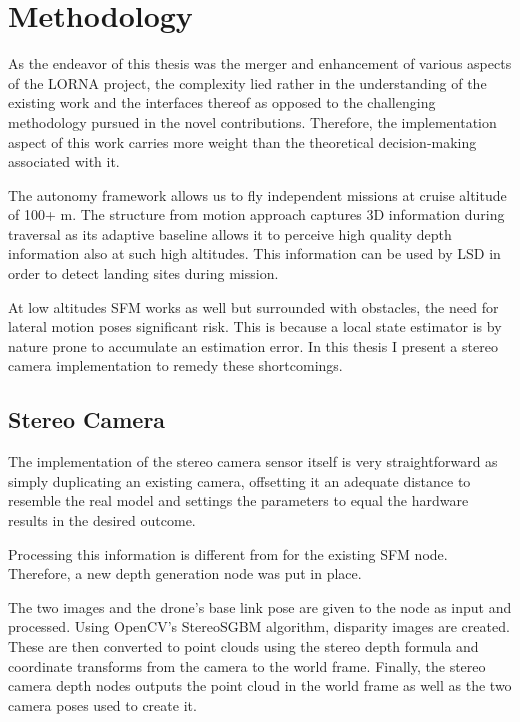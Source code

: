 \chapter{Methodology}
\label{sec:methodology}

As the endeavor of this thesis was the merger and enhancement of various aspects of the LORNA project, the complexity lied rather in the understanding of the existing work and the interfaces thereof as opposed to the challenging methodology pursued in the novel contributions. Therefore, the implementation aspect of this work carries more weight than the theoretical decision-making associated with it.

The autonomy framework\citep{Autonomy} allows us to fly independent missions at cruise altitude of 100+ m. The structure from motion approach captures 3D information during traversal as its adaptive baseline allows it to perceive high quality depth information also at such high altitudes. This information can be used by LSD in order to detect landing sites during mission. 

At low altitudes SFM works as well but surrounded with obstacles, the need for lateral motion poses significant risk. This is because a local state estimator is by nature prone to accumulate an estimation error. In this thesis I present a stereo camera implementation to remedy these shortcomings.


\section{Stereo Camera}

The implementation of the stereo camera sensor itself is very straightforward as simply duplicating an existing camera, offsetting it an adequate distance to resemble the real model and settings the parameters to equal the hardware results in the desired outcome.

Processing this information is different from for the existing SFM node. Therefore, a new depth generation node was put in place. 

The two images and the drone's base link pose are given to the node as input and processed. Using OpenCV's StereoSGBM algorithm, disparity images are created. These are then converted to point clouds using the stereo depth formula and coordinate transforms from the camera to the world frame. Finally, the stereo camera depth nodes outputs the point cloud in the world frame as well as the two camera poses used to create it.

